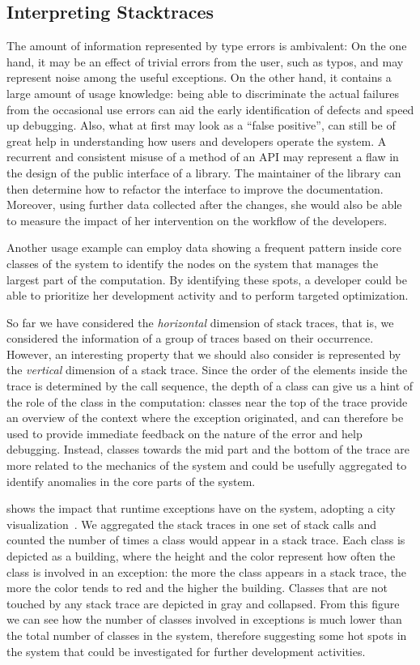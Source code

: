 \subsection{Interpreting Stacktraces}

The amount of information represented by type errors is ambivalent: On the one hand, it may be an effect of trivial errors from the user, such as typos, and may represent noise among the useful exceptions.
On the other hand, it contains a large amount of usage knowledge: being able to discriminate the actual failures from the occasional use errors can aid the early identification of defects and speed up debugging.
Also, what at first may look as a ``false positive'', can still be of great help in understanding how users and developers operate the system.
A recurrent and consistent misuse of a method of an API may represent a flaw in the design of the public interface of a library.
The maintainer of the library can then determine how to refactor the interface to improve the documentation.
Moreover, using further data collected after the changes, she would also be able to measure the impact of her intervention on the workflow of the developers.

Another usage example can employ data showing a frequent pattern inside core classes of the system to identify the nodes on the system that manages the largest part of the computation.
By identifying these spots, a developer could be able to prioritize her development activity and to perform targeted optimization.

So far we have considered the \emph{horizontal} dimension of stack traces, that is, we considered the information of a group of traces based on their occurrence.
However, an interesting property that we should also consider is represented by the \emph{vertical} dimension of a stack trace.
Since the order of the elements inside the trace is determined by the call sequence, the depth of a class can give us a hint of the role of the class in the computation: classes near the top of the trace provide an overview of the context where the exception originated, and can therefore be used to provide immediate feedback on the nature of the error and help debugging.
Instead, classes towards the mid part and the bottom of the trace are more related to the mechanics of the system and could be usefully aggregated to identify anomalies in the core parts of the system.

 shows the impact that runtime exceptions have on the \pha system, adopting a city visualization~\cite{Wett2011a}.
We aggregated the stack traces in one set of stack calls and counted the number of times a class would appear in a stack trace.
Each class is depicted as a building, where the height and the color represent how often the class is involved in an exception: the more the class appears in a stack trace, the more the color tends to red and the higher the building.
Classes that are not touched by any stack trace are depicted in gray and collapsed.
From this figure we can see how the number of classes involved in exceptions is much lower than the total number of classes in the system, therefore suggesting some hot spots in the system that could be investigated for further development activities.

